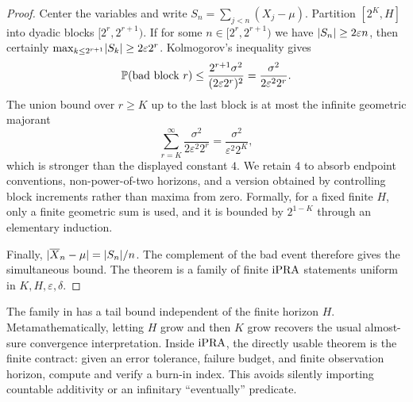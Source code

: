 \begin{proof}
Center the variables and write \(S_n=\sum_{j<n}(X_j-\mu)\).  Partition
\([2^K,H]\) into dyadic blocks \([2^r,2^{r+1})\).  If for some
\(n\in[2^r,2^{r+1})\) we have \(\lvert S_n\rvert\ge2\varepsilon n\), then certainly
\(\max_{k\le2^{r+1}}\lvert S_k\rvert\ge2\varepsilon2^r\).  Kolmogorov's inequality
gives
\[
 \mathbb P(\text{bad block }r)
 \le\frac{2^{r+1}\sigma^2}{(2\varepsilon2^r)^2}
 =\frac{\sigma^2}{2\varepsilon^2 2^r}.
\]
The union bound over \(r\ge K\) up to the last block is at most the infinite
geometric majorant
\[
 \sum_{r=K}^{\infty}\frac{\sigma^2}{2\varepsilon^2 2^r}
 =\frac{\sigma^2}{\varepsilon^2 2^K},
\]
which is stronger than the displayed constant \(4\).  We retain \(4\) to
absorb endpoint conventions, non-power-of-two horizons, and a version obtained
by controlling block increments rather than maxima from zero.  Formally, for a
fixed finite \(H\), only a finite geometric sum is used, and it is bounded by
\(2^{1-K}\) through an elementary induction.

Finally, \(\lvert \overline X_n-\mu\rvert=\lvert S_n\rvert/n\).  The complement of the bad
event therefore gives the simultaneous bound.  The theorem is a family of
finite \(\mathrm{iPRA}\) statements uniform in \(K,H,\varepsilon,\delta\).
\end{proof}

\begin{remark}
The family in  has a tail bound independent of the finite
horizon \(H\).  Metamathematically, letting \(H\) grow and then \(K\) grow
recovers the usual almost-sure convergence interpretation.  Inside \(\mathrm{iPRA}\),
the directly usable theorem is the finite contract: given an error tolerance,
failure budget, and finite observation horizon, compute and verify a burn-in
index.  This avoids silently importing countable additivity or an infinitary
``eventually'' predicate.
\end{remark}
